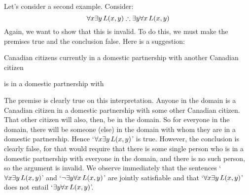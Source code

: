 Let's consider a second example. Consider:
$$\forall x \exists y\, \atom{L}{x,y} \therefore \exists y \forall x\, \atom{L}{x,y}$$
Again, we want to show that this is invalid. To do this, we must make the premises true and the conclusion false. Here is a suggestion:
\begin{ekey}
	\item[\text{domain}] Canadian citizens currently in a domestic partnership with another Canadian citizen
	\item[\atom{L}{x,y}]  is in a domestic partnership with 
\end{ekey}
The premise is clearly true on this interpretation. Anyone in the domain is a Canadian citizen in a domestic partnership with some other Canadian citizen. That other citizen will also, then, be in the domain. So for everyone in the domain, there will be someone (else) in the domain with whom they are in a domestic partnership. Hence `$\forall x \exists y\, \mathord{L}(x,y)$' is true. However, the conclusion is clearly false, for that would require that there is some single person who is in a domestic partnership with everyone in the domain, and there is no such person, so the argument is invalid. We observe immediately that the sentences `$\forall x \exists y\, \mathord{L}(x,y)$' and `$\neg\exists y \forall x\, \mathord{L}(x,y)$' are jointly satisfiable and that `$\forall x \exists y\, \mathord{L}(x,y)$' does not entail `$\exists y \forall x\, \mathord{L}(x,y)$'. 

